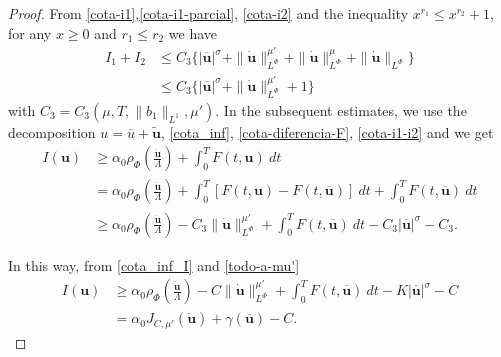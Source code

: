 \documentclass[twoside]{article}
\theoremstyle{remark}
\newcommand{\orlnor}{\|_{L^{\Phi}}}
\renewcommand{\b}[1]{\boldsymbol{#1}}
\renewcommand{\leq}{\leqslant}
\begin{document}
\begin{proof}
From \eqref{cota-i1},\eqref{cota-i1-parcial}, \eqref{cota-i2} and the inequality $x^{r_1}\leq x^{r_2}+1$, for any $x\geq 0$ and $r_1\leq r_2$ we have
\begin{equation}\label{cota-i1-i2}
\begin{split}
I_1+I_2
&\leq C_3\bigg\{ |\b{\overline{u}}|^{\sigma}
+ \|\b{\dot u}\orlnor^{\mu'}
+ \|\b{\dot u}\orlnor^{\mu}
+\|\b{\dot u}\orlnor\bigg\}\\
&\leq C_3\bigg\{ |\b{\overline{u}}|^{\sigma}
+ \|\b{\dot u}\orlnor^{\mu'}
+1\bigg\}
\end{split}
\end{equation}
with $C_3= C_3(\mu,T, \|b_1\|_{L^1},\mu' )$. In the subsequent estimates, we use the decomposition $u=\overline{u}+\b{\tilde{u}}$, \eqref{cota_inf}, \eqref{cota-diferencia-F},
\eqref{cota-i1-i2} and we get
\begin{equation}\label{cota_inf_I}
\begin{split}
I(\b{u})&\geq\alpha_0\rho_{\Phi}\left( \frac{\b{\dot{u}}}{\Lambda}\right)+\int_0^TF(t,\b{u})\ dt
\\ 
&=\alpha_0\rho_{\Phi}\left( \frac{\b{\dot{u}}}{\Lambda}\right)+ \int_0^T \left[F(t,\b{u})-F(t,\b{\overline{u}})\right]\ dt 
+  \int_0^TF(t,\b{\overline{u}})\ dt
\\
&\geq \alpha_0\rho_{\Phi}\left( \frac{\b{\dot{u}}}{\Lambda}\right)
-C_3 \|\b{\dot u}\orlnor^{\mu'}
+\int_0^TF(t,\b{\overline{u}})\ dt-
C_3 |\b{\overline{u}}|^{\sigma}-C_3.
\end{split}
\end{equation}

In this way, from \eqref{cota_inf_I} and \eqref{todo-a-mu'}
\[
\begin{split}
I(\b{u})
&\geq\alpha_0\rho_{\Phi}\left( \frac{\b{\dot{u}}}{\Lambda}\right)
-C\|\b{\dot u}\orlnor^{\mu'}
+\int_0^TF(t,\b{\overline{u}})\ dt-K|\b{\overline{u}}|^{\sigma}
-C
\\
&=\alpha_0J_{C,\mu'}(\b{\dot u})
+ \gamma(\b{\overline{u}})-C.
\end{split}
\]





\end{proof}
\end{document}
